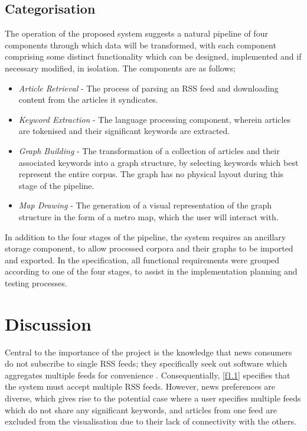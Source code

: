 \subsection{Categorisation}
The operation of the proposed system suggests a natural pipeline of four components through which data will be transformed, with each component comprising some distinct functionality which can be designed, implemented and if necessary modified, in isolation. The components are as follows;
\begin{itemize}
	\item \textit{Article Retrieval} - The process of parsing an RSS feed and downloading content from the articles it syndicates.
	\item \textit{Keyword Extraction} - The language processing component, wherein articles are tokenised and their significant keywords are extracted.
	\item \textit{Graph Building} - The transformation of a collection of articles and their associated keywords into a graph structure, by selecting keywords which best represent the entire corpus. The graph has no physical layout during this stage of the pipeline.
	\item \textit{Map Drawing} - The generation of a visual representation of the graph structure in the form of a metro map, which the user will interact with.
\end{itemize}
In addition to the four stages of the pipeline, the system requires an ancillary storage component, to allow processed corpora and their graphs to be imported and exported. In the specification, all functional requirements were grouped according to one of the four stages, to assist in the implementation planning and testing processes.

\section{Discussion}

Central to the importance of the project is the knowledge that news consumers do not subscribe to single RSS feeds; they specifically seek out software which aggregates multiple feeds for convenience \citep{Nreader}. Consequentially, \ref{f1.1} specifies that the system must accept multiple RSS feeds. However, news preferences are diverse, which gives rise to the potential case where a user specifies multiple feeds which do not share any significant keywords, and articles from one feed are excluded from the visualisation due to their lack of connectivity with the others. 

